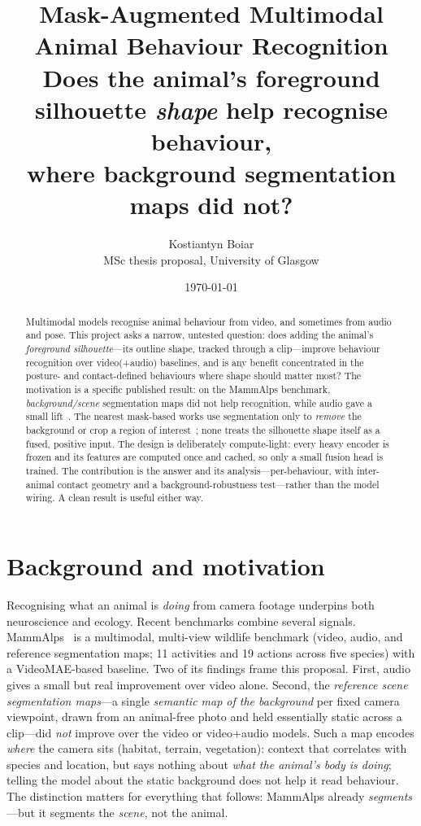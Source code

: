 \documentclass[11pt]{article}
\title{\textbf{Mask-Augmented Multimodal Animal Behaviour Recognition}\\[2pt]
\large Does the animal's foreground silhouette \emph{shape} help recognise behaviour,\\ where background segmentation maps did not?}
\author{Kostiantyn Boiar\\[2pt]
\small MSc thesis proposal, University of Glasgow}
\date{\today}
\begin{document}
\maketitle

\begin{abstract}
\noindent Multimodal models recognise animal behaviour from video, and sometimes from audio and pose. This project asks a narrow, untested question: does adding the animal's \emph{foreground silhouette}---its outline shape, tracked through a clip---improve behaviour recognition over video(+audio) baselines, and is any benefit concentrated in the posture- and contact-defined behaviours where shape should matter most? The motivation is a specific published result: on the MammAlps benchmark, \emph{background/scene} segmentation maps did not help recognition, while audio gave a small lift~\cite{mammalps}. The nearest mask-based works use segmentation only to \emph{remove} the background or crop a region of interest~\cite{panaf,maroon}; none treats the silhouette shape itself as a fused, positive input. The design is deliberately compute-light: every heavy encoder is frozen and its features are computed once and cached, so only a small fusion head is trained. The contribution is the answer and its analysis---per-behaviour, with inter-animal contact geometry and a background-robustness test---rather than the model wiring. A clean result is useful either way.
\end{abstract}

\section{Background and motivation}
Recognising what an animal is \emph{doing} from camera footage underpins both neuroscience and ecology. Recent benchmarks combine several signals. MammAlps~\cite{mammalps} is a multimodal, multi-view wildlife benchmark (video, audio, and reference segmentation maps; 11 activities and 19 actions across five species) with a VideoMAE-based baseline. Two of its findings frame this proposal. First, audio gives a small but real improvement over video alone. Second, the \emph{reference scene segmentation maps}---a single \emph{semantic map of the background} per fixed camera viewpoint, drawn from an animal-free photo and held essentially static across a clip---did \emph{not} improve over the video or video+audio models. Such a map encodes \emph{where} the camera sits (habitat, terrain, vegetation): context that correlates with species and location, but says nothing about \emph{what the animal's body is doing}; telling the model about the static background does not help it read behaviour. The distinction matters for everything that follows: MammAlps already \emph{segments}---but it segments the \emph{scene}, not the animal.
\end{document}
